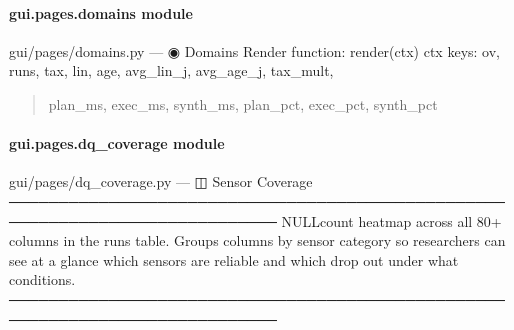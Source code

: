 \documentclass[letterpaper,10pt,english]{sphinxmanual}
\begin{document}
\paragraph{gui.pages.domains module}
\label{\detokenize{gui.pages.domains:module-gui.pages.domains}}\label{\detokenize{gui.pages.domains:gui-pages-domains-module}}\label{\detokenize{gui.pages.domains::doc}}
\sphinxAtStartPar
gui/pages/domains.py  —  ◉  Domains
Render function: render(ctx)
ctx keys: ov, runs, tax, lin, age, avg\_lin\_j, avg\_age\_j, tax\_mult,
\begin{quote}

\sphinxAtStartPar
plan\_ms, exec\_ms, synth\_ms, plan\_pct, exec\_pct, synth\_pct
\end{quote}

\begin{fulllineitems}
\label{\detokenize{gui.pages.domains:gui.pages.domains.render}}
\pysigstartsignatures
\pysiglinewithargsret
{}
{}
{}
\pysigstopsignatures
\end{fulllineitems}


\sphinxstepscope


\paragraph{gui.pages.dq\_coverage module}
\label{\detokenize{gui.pages.dq_coverage:module-gui.pages.dq_coverage}}\label{\detokenize{gui.pages.dq_coverage:gui-pages-dq-coverage-module}}\label{\detokenize{gui.pages.dq_coverage::doc}}
\sphinxAtStartPar
gui/pages/dq\_coverage.py  —  ◫  Sensor Coverage
─────────────────────────────────────────────────────────────────────────────
NULL\sphinxhyphen{}count heatmap across all 80+ columns in the runs table.
Groups columns by sensor category so researchers can see at a glance
which sensors are reliable and which drop out under what conditions.
─────────────────────────────────────────────────────────────────────────────
\end{document}
